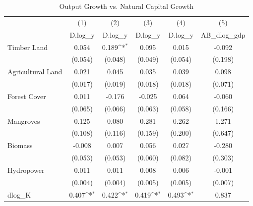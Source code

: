 \begin{table}[htbp]\centering
\def\sym#1{\ifmmode^{#1}\else\(^{#1}\)\fi}
\caption{Output Growth vs. Natural Capital Growth}
\begin{tabular}{l*{5}{c}}
\hline\hline
            &\multicolumn{1}{c}{(1)}&\multicolumn{1}{c}{(2)}&\multicolumn{1}{c}{(3)}&\multicolumn{1}{c}{(4)}&\multicolumn{1}{c}{(5)}\\
            &\multicolumn{1}{c}{D.log\_y}&\multicolumn{1}{c}{D.log\_y}&\multicolumn{1}{c}{D.log\_y}&\multicolumn{1}{c}{D.log\_y}&\multicolumn{1}{c}{AB\_dlog\_gdp}\\
\hline
Timber Land&       0.054       &       0.189\sym{*}&       0.095       &       0.015       &      -0.092       \\
            &     (0.054)       &     (0.048)       &     (0.049)       &     (0.054)       &     (0.198)       \\
[1em]
Agricultural Land   &       0.021       &       0.045       &       0.035       &       0.039       &       0.098       \\
            &     (0.017)       &     (0.019)       &     (0.018)       &     (0.018)       &     (0.071)       \\
[1em]
Forest Cover&       0.011       &      -0.176       &      -0.025       &       0.064       &      -0.060       \\
            &     (0.065)       &     (0.066)       &     (0.063)       &     (0.058)       &     (0.166)       \\
[1em]
Mangroves&       0.125       &       0.080       &       0.281       &       0.262       &       1.271       \\
            &     (0.108)       &     (0.116)       &     (0.159)       &     (0.200)       &     (0.647)       \\
[1em]
Biomass    &      -0.008       &       0.007       &       0.056       &       0.027       &      -0.280       \\
            &     (0.053)       &     (0.053)       &     (0.060)       &     (0.082)       &     (0.303)       \\
[1em]
Hydropower &       0.011       &       0.011       &       0.008       &       0.006       &      -0.001       \\
            &     (0.004)       &     (0.004)       &     (0.005)       &     (0.005)       &     (0.007)       \\
[1em]
dlog\_K      &       0.407\sym{*}&       0.422\sym{*}&       0.419\sym{*}&       0.493\sym{*}&       0.837       \\

\end{tabular}
\end{table}
